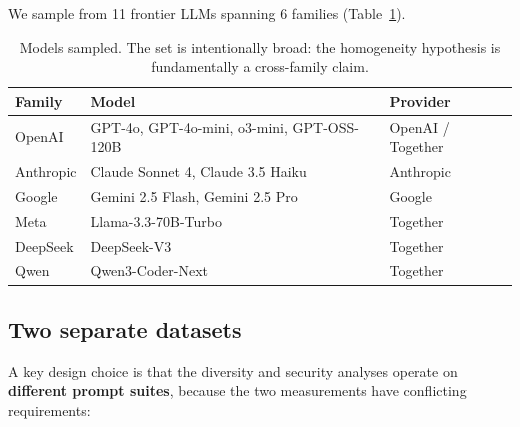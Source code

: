 \documentclass{article}
\begin{document}
We sample from 11 frontier LLMs spanning 6 families
(Table~\ref{tab:models}).

\begin{table}[h]
\centering\small
\begin{tabular}{lll}
\toprule
Family & Model & Provider \\
\midrule
OpenAI    & GPT-4o, GPT-4o-mini, o3-mini, GPT-OSS-120B & OpenAI / Together \\
Anthropic & Claude Sonnet 4, Claude 3.5 Haiku & Anthropic \\
Google    & Gemini 2.5 Flash, Gemini 2.5 Pro & Google \\
Meta      & Llama-3.3-70B-Turbo & Together \\
DeepSeek  & DeepSeek-V3 & Together \\
Qwen      & Qwen3-Coder-Next & Together \\
\bottomrule
\end{tabular}
\caption{Models sampled. The set is intentionally broad: the homogeneity
hypothesis is fundamentally a cross-family claim.}
\label{tab:models}
\end{table}

\subsection{Two separate datasets}

A key design choice is that the diversity and security analyses operate on
\textbf{different prompt suites}, because the two measurements have
conflicting requirements:
\end{document}
